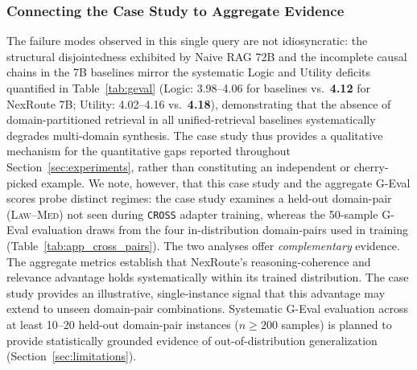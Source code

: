 \documentclass[a4paper,fleql]{cas-sc}
\begin{document}
\subsubsection{Connecting the Case Study to Aggregate Evidence}
\label{sssec:connecting-aggregate}
The failure modes observed in this single query are not idiosyncratic: the
structural disjointedness exhibited by Naive RAG 72B and the incomplete
causal chains in the 7B baselines mirror the systematic Logic and Utility
deficits quantified in Table~\ref{tab:geval} (Logic: 3.98--4.06 for
baselines vs.\ \textbf{4.12} for NexRoute 7B; Utility: 4.02--4.16 vs.\
\textbf{4.18}), demonstrating that the absence of domain-partitioned retrieval
in all unified-retrieval baselines systematically degrades multi-domain
synthesis. The case study thus provides a qualitative mechanism for the
quantitative gaps reported throughout Section~\ref{sec:experiments}, rather
than constituting an independent or cherry-picked example. We note, however,
that this case study and the aggregate G-Eval scores probe distinct
regimes: the case study examines a held-out domain-pair (\textsc{Law}--\textsc{Med})
not seen during \texttt{CROSS} adapter training, whereas the 50-sample
G-Eval evaluation draws from the four in-distribution domain-pairs used in
training (Table~\ref{tab:app_cross_pairs}). The two analyses offer \emph{complementary} evidence. The aggregate metrics
establish that NexRoute's reasoning-coherence and relevance advantage holds
systematically within its trained distribution. The case study provides an
illustrative, single-instance signal that this advantage may extend to unseen
domain-pair combinations. Systematic G-Eval evaluation across at least
10--20 held-out domain-pair instances ($n{\geq}200$ samples) is planned
to provide statistically grounded evidence of out-of-distribution
generalization (Section~\ref{sec:limitations}).

\end{document}
